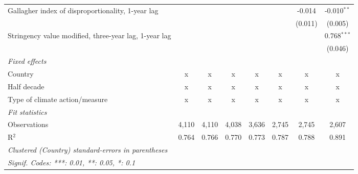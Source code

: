 \begin{table}[htbp]
\begin{tabular}{lccccccc}
      Gallagher index of disproportionality, 1-year lag     &         &         &              &              &               & -0.014        & -0.010$^{**}$\\   
                                                            &         &         &              &              &               & (0.011)       & (0.005)\\   
      Stringency value modified, three-year lag, 1-year lag &         &         &              &              &               &               & 0.768$^{***}$\\   
                                                            &         &         &              &              &               &               & (0.046)\\   
      \emph{Fixed effects}\\
      Country                                               & x       & x       & x            & x            & x             & x             & x\\  
      Half decade                                           & x       & x       & x            & x            & x             & x             & x\\  
      Type of climate action/measure                        & x       & x       & x            & x            & x             & x             & x\\  
      \midrule \emph{Fit statistics}\\
      Observations                                          & 4,110   & 4,110   & 4,038        & 3,636        & 2,745         & 2,745         & 2,607\\  
      R$^2$                                                 & 0.764   & 0.766   & 0.770        & 0.773        & 0.787         & 0.788         & 0.891\\  
      \midrule
      \multicolumn{8}{l}{\emph{Clustered (Country) standard-errors in parentheses}}\\
      \multicolumn{8}{l}{\emph{Signif. Codes: ***: 0.01, **: 0.05, *: 0.1}}\\
   \end{tabular}
\end{table}


